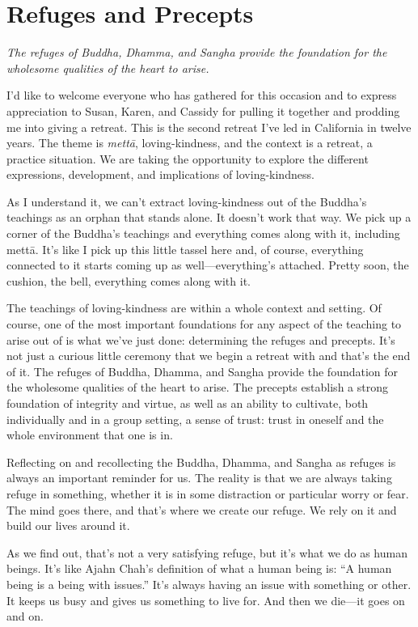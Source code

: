 \chapter{Refuges and Precepts}

\epigraph{\emph{The refuges of Buddha, Dhamma, and Sangha provide the
foundation for the wholesome qualities of the heart to arise.}}{}

I’d like to welcome everyone who has gathered for this occasion and to
express appreciation to Susan, Karen, and Cassidy for pulling it
together and prodding me into giving a retreat. This is the second
retreat I’ve led in California in twelve years. The theme is
\emph{mettā}, loving-kindness, and the context is a retreat, a practice
situation. We are taking the opportunity to explore the different
expressions, development, and implications of loving-kindness.

As I understand it, we can’t extract loving-kindness out of the Buddha’s
teachings as an orphan that stands alone. It doesn’t work that way. We
pick up a corner of the Buddha’s teachings and everything comes along
with it, including mettā. It’s like I pick up this little tassel here
and, of course, everything connected to it starts coming up as
well—everything’s attached. Pretty soon, the cushion, the bell,
everything comes along with it.

The teachings of loving-kindness are within a whole context and setting.
Of course, one of the most important foundations for any aspect of the
teaching to arise out of is what we’ve just done: determining the
refuges and precepts. It’s not just a curious little ceremony that we
begin a retreat with and that’s the end of it. The refuges of Buddha,
Dhamma, and Sangha provide the foundation for the wholesome qualities of
the heart to arise. The precepts establish a strong foundation of
integrity and virtue, as well as an ability to cultivate, both
individually and in a group setting, a sense of trust: trust in oneself
and the whole environment that one is in.

Reflecting on and recollecting the Buddha, Dhamma, and Sangha as refuges
is always an important reminder for us. The reality is that we are
always taking refuge in something, whether it is in some distraction or
particular worry or fear. The mind goes there, and that’s where we
create our refuge. We rely on it and build our lives around it.

As we find out, that’s not a very satisfying refuge, but it’s what we do
as human beings. It’s like Ajahn Chah’s definition of what a human being
is: “A human being is a being with issues.” It’s always having an issue
with something or other. It keeps us busy and gives us something to live
for. And then we die—it goes on and on.


